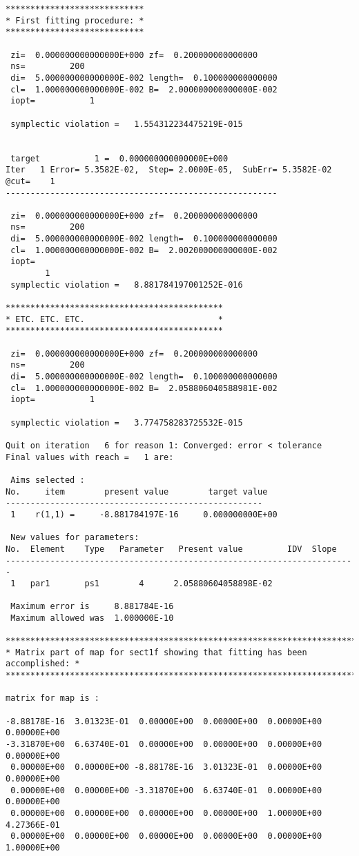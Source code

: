 \begin{footnotesize}
\begin{verbatim}
****************************
* First fitting procedure: *
****************************

 zi=  0.000000000000000E+000 zf=  0.200000000000000
 ns=         200
 di=  5.000000000000000E-002 length=  0.100000000000000
 cl=  1.000000000000000E-002 B=  2.000000000000000E-002
 iopt=           1

 symplectic violation =   1.554312234475219E-015


 target           1 =  0.000000000000000E+000
Iter   1 Error= 5.3582E-02,  Step= 2.0000E-05,  SubErr= 5.3582E-02 @cut=    1
-------------------------------------------------------

 zi=  0.000000000000000E+000 zf=  0.200000000000000
 ns=         200
 di=  5.000000000000000E-002 length=  0.100000000000000
 cl=  1.000000000000000E-002 B=  2.002000000000000E-002
 iopt=
        1
 symplectic violation =   8.881784197001252E-016

********************************************
* ETC. ETC. ETC.                           *
********************************************

 zi=  0.000000000000000E+000 zf=  0.200000000000000
 ns=         200
 di=  5.000000000000000E-002 length=  0.100000000000000
 cl=  1.000000000000000E-002 B=  2.058806040588981E-002
 iopt=           1

 symplectic violation =   3.774758283725532E-015

Quit on iteration   6 for reason 1: Converged: error < tolerance
Final values with reach =   1 are:

 Aims selected :
No.     item        present value        target value
----------------------------------------------------
 1    r(1,1) =     -8.881784197E-16     0.000000000E+00

 New values for parameters:
No.  Element    Type   Parameter   Present value         IDV  Slope
-----------------------------------------------------------------------
 1   par1       ps1        4      2.05880604058898E-02

 Maximum error is     8.881784E-16
 Maximum allowed was  1.000000E-10

*****************************************************************************
* Matrix part of map for sect1f showing that fitting has been accomplished: *
*****************************************************************************

matrix for map is :

-8.88178E-16  3.01323E-01  0.00000E+00  0.00000E+00  0.00000E+00  0.00000E+00
-3.31870E+00  6.63740E-01  0.00000E+00  0.00000E+00  0.00000E+00  0.00000E+00
 0.00000E+00  0.00000E+00 -8.88178E-16  3.01323E-01  0.00000E+00  0.00000E+00
 0.00000E+00  0.00000E+00 -3.31870E+00  6.63740E-01  0.00000E+00  0.00000E+00
 0.00000E+00  0.00000E+00  0.00000E+00  0.00000E+00  1.00000E+00  4.27366E-01
 0.00000E+00  0.00000E+00  0.00000E+00  0.00000E+00  0.00000E+00  1.00000E+00


\end{verbatim}
\end{footnotesize}
